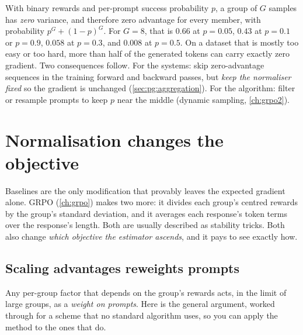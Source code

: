 \begin{napkinmath}
With binary rewards and per-prompt success probability $p$, a group of $G$ samples has
\emph{zero} variance, and therefore zero advantage for every member, with probability
$p^G+(1-p)^G$. For $G=8$, that is $0.66$ at $p=0.05$, $0.43$ at $p=0.1$ or $p=0.9$, $0.058$
at $p=0.3$, and $0.008$ at $p=0.5$. On a dataset that is mostly too easy or too hard, more than
half of the generated tokens can carry exactly zero gradient. Two consequences follow. For
the systems: skip zero-advantage sequences in the training forward and backward passes, but
\emph{keep the normaliser fixed} so the gradient is unchanged (\cref{sec:pg:aggregation}).
For the algorithm: filter or resample prompts to keep $p$ near the middle (dynamic sampling,
\cref{ch:grpo2}).
\end{napkinmath}
\section{Normalisation changes the objective}\label{sec:pg:normalisation}

Baselines are the only modification that provably leaves the expected gradient alone. GRPO
(\cref{ch:grpo}) makes two more: it divides each group's centred rewards by the group's
standard deviation, and it averages each response's token terms over the response's length.
Both are usually described as stability tricks. Both also change \emph{which objective the
estimator ascends}, and it pays to see exactly how.

\subsection{Scaling advantages reweights prompts}\label{sec:pg:reweight}

Any per-group factor that depends on the group's rewards acts, in the limit of large groups,
as a \emph{weight on prompts}. Here is the general argument, worked through for a scheme that
no standard algorithm uses, so you can apply the method to the ones that do.

